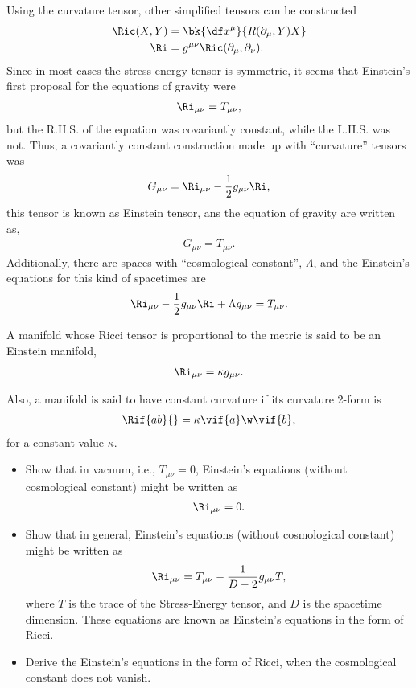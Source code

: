 Using the curvature tensor, other simplified tensors can be constructed
\begin{align}
  \Ric(X,Y) &= \bk{\df x^\mu}{R(\partial_\mu,Y)X}\\
  \Ri &= g^{\mu \nu}\Ric(\partial_\mu,\partial_\nu).
\end{align}
Since in most cases the stress-energy tensor is symmetric, it seems that Einstein's first proposal for the equations of gravity were
\begin{align}
  \Ri_{\mu\nu}=T_{\mu\nu},
\end{align}
but the R.H.S. of the equation was covariantly constant, while the L.H.S. was not. Thus, a covariantly constant construction made up with ``curvature'' tensors was
\begin{align}
  G_{\mu\nu} = \Ri_{\mu\nu}-\frac{1}{2}g_{\mu\nu}\Ri,
\end{align}
this tensor is known as Einstein tensor, ans the equation of gravity are written as,
\begin{align}
  G_{\mu\nu}= T_{\mu\nu}.
\end{align}
Additionally, there are spaces with ``cosmological constant'', $\Lambda$, and the Einstein's equations for this kind of spacetimes are
\begin{align}
  \Ri_{\mu\nu}-\frac{1}{2}g_{\mu\nu}\Ri + \Lambda g_{\mu\nu}= T_{\mu\nu}.
\end{align}

A manifold whose Ricci tensor is proportional to the metric is said to be an Einstein manifold,
\begin{align}
  \Ri_{\mu\nu} = \kappa g_{\mu\nu}.\label{def-const-curv}
\end{align}

Also, a manifold is said to have constant curvature if its curvature 2-form is
\begin{align}
  \Rif{ab}{} = \kappa\vif{a}\w\vif{b},
\end{align}
for a constant value $\kappa$.

\begin{Ebox}
  \begin{itemize}
  \item Show that in vacuum, i.e., $T_{\mu\nu}=0$, Einstein's equations (without cosmological constant) might be written as
    \begin{align}
      \Ri_{\mu\nu}=0.
    \end{align}
  \item Show that in general, Einstein's equations  (without cosmological constant) might be written as
    \begin{align}
      \Ri_{\mu\nu}= T_{\mu\nu}-\frac{1}{D-2}g_{\mu\nu} T,
    \end{align}
    where $T$ is the trace of the Stress-Energy tensor,  and  $D$ is the spacetime dimension. These equations are known as Einstein's equations in the form of Ricci.
  \item Derive the Einstein's equations in the form of Ricci, when the cosmological constant does not vanish.
  \end{itemize}
\end{Ebox}



